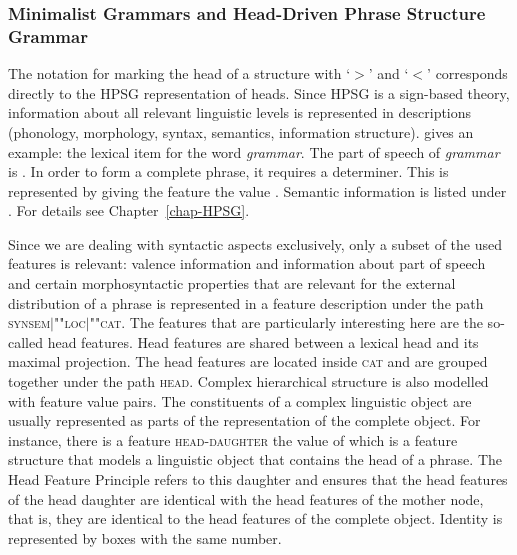 \subsubsection{Minimalist Grammars and Head-Driven Phrase Structure Grammar}
\label{sec-minimalism-atb-extraction}

The notation for marking the head of a structure with `$>$' and `$<$' corresponds directly to the
HPSG representation of heads. Since HPSG is a sign-based theory, information about all relevant
linguistic levels is represented in descriptions (phonology, morphology, syntax, semantics,
information structure).  gives an example: the lexical item for the word \emph{grammar}.
\ea 
{}
\z
The part of speech of \emph{grammar} is . In order to form a complete phrase, it requires
a determiner. This is represented by giving the \spr feature the value . Semantic
information is listed under \cont. For details see Chapter~\ref{chap-HPSG}.

Since we are dealing with syntactic aspects exclusively, only a subset of the used features is
relevant: valence information and information about part of speech and certain
morphosyntactic properties that are relevant for the external distribution of a phrase is
represented in a feature description under the path \textsc{synsem$|$""loc$|$""cat}. The features that
are particularly interesting here are the so-called head features. Head features are shared between
a lexical head and its maximal projection. The head features are located inside \textsc{cat} and are
grouped together under the path \textsc{head}. Complex hierarchical structure is also modelled with
feature value pairs. The constituents of a complex linguistic object are usually represented as
parts of the representation of the complete object. For instance, there is a feature \textsc{head-daughter} the value of which is a feature structure that models a linguistic object that
contains the head of a phrase. The Head Feature Principle  refers to this daughter and ensures that the head
features of the head daughter are identical with the head features of the mother node, that is, they
are identical to the head features of the complete object.
\ea
{} \impl
{} 
\z
Identity is represented by boxes with the same number. 

